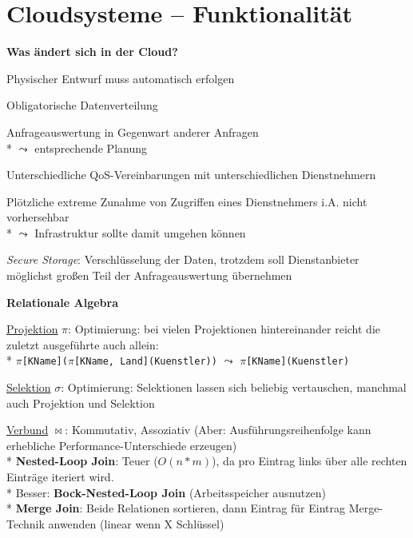\section{Cloudsysteme -- Funktionalität}
\label{sec:cloudfunktionalitaet}

\textbf{Was ändert sich in der Cloud?}
\begin{items}
	\item Physischer Entwurf muss automatisch erfolgen
	\item Obligatorische Datenverteilung
	\item Anfrageauswertung in Gegenwart anderer Anfragen
		\\*
		\( \leadsto \) entsprechende Planung
	\item Unterschiedliche QoS-Vereinbarungen mit unterschiedlichen Dienstnehmern
	\item Plötzliche extreme Zunahme von Zugriffen eines Dienstnehmers i.A. nicht vorhersehbar 
		\\*
		\( \leadsto \) Infrastruktur sollte damit umgehen können
	\item \emph{Secure Storage}: Verschlüsselung der Daten, trotzdem soll Dienstanbieter möglichst großen Teil der Anfrageauswertung übernehmen
\end{items}

\textbf{Relationale Algebra}
\begin{items}
	\item \underline{Projektion} $\pi$: Optimierung: bei vielen Projektionen hintereinander reicht die zuletzt ausgeführte auch allein:
		\\*
		\( \pi \)\lstinline{[KName](}\( \pi \)\lstinline{[KName, Land](Kuenstler))} \( \leadsto \) \( \pi \)\lstinline{[KName](Kuenstler)}
	\item \underline{Selektion} $\sigma$: Optimierung: Selektionen lassen sich beliebig vertauschen, manchmal auch Projektion und Selektion
	\item \underline{Verbund} $\bowtie$: Kommutativ, Assoziativ (Aber: Ausführungsreihenfolge kann erhebliche Performance-Unterschiede erzeugen)
		\\*
		\textbf{Nested-Loop Join}: Teuer ($O(n * m)$), da pro Eintrag links über alle rechten Einträge iteriert wird. \\*
		Besser: \textbf{Bock-Nested-Loop Join }(Arbeitsspeicher ausnutzen)
		\\*
		\textbf{Merge Join}: Beide Relationen sortieren, dann Eintrag für Eintrag Merge-Technik anwenden (linear wenn X Schlüssel)
\end{items}

